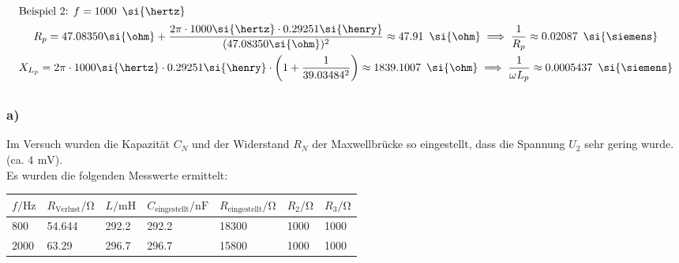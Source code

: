 \documentclass[a4paper, 12pt]{article}
\begin{document}
      \begin{gather*}
        \intertext{Beispiel 2: $f = 1000 \,\ \si{\hertz}$}
        R_p = 47.08350 \si{\ohm} + \frac{2 \pi \cdot 1000 \si{\hertz} \cdot 0.29251 \si{\henry}}{(47.08350 \si{\ohm})^2} \approx 47.91 \,\ \si{\ohm} \implies \frac{1}{R_p} \approx 0.02087 \,\ \si{\siemens}\\
        X_{L_{p}} = 2 \pi \cdot 1000 \si{\hertz} \cdot 0.29251 \si{\henry} \cdot \left( 1+\frac{1}{39.03484^2}\right) \approx 1839.1007 \,\ \si{\ohm} \implies \frac{1}{\omega L_p} \approx 0.0005437  \,\ \si{\siemens}
      \end{gather*}

  \subsection{}
    \subsubsection*{a)}
      Im Versuch wurden die Kapazität $C_N$ und der Widerstand $R_N$ der Maxwellbrücke so eingestellt, dass die Spannung $U_2$ sehr gering wurde. (ca. $4 \,\ \si{\milli\volt}$).\\
      Es wurden die folgenden Messwerte ermittelt:
      \begin{table}[H]
      \begin{center}
        \begin{tabular}{@{}lllllll@{}}
        \toprule
        $f / \si{\hertz}$    & $R_{\text{Verlust}} /\si{\ohm}$      & $L / \si{\milli\henry}$      & $C_{\text{eingestellt}} / \si{\nano\farad}$       & $R_{\text{eingestellt}}/\si{\ohm}$  & $R_2 /\si{\ohm}$   & $R_3 /\si{\ohm}$   \\ \midrule
        800  & 54.644 & 292.2 & 292.2 & 18300     & 1000 & 1000 \\
        2000 & 63.29  & 296.7 & 296.7 & 15800     & 1000 & 1000 \\ \bottomrule
        \end{tabular}
      \end{center}
      \end{table}
\end{document}
